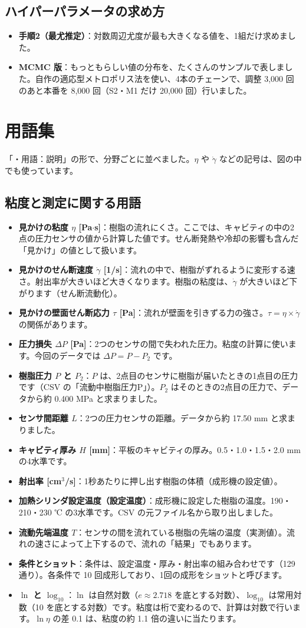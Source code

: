 \documentclass[paper=a4paper,fontsize=10.5pt,line_length=44zw,number_of_lines=38]{jlreq}
\newcommand{\gd}{\dot{\gamma}}
\newenvironment{termlist}{\begin{itemize}[label=・,leftmargin=1\zw,labelwidth=1\zw,labelsep=0pt,itemsep=0.4ex,topsep=0.6ex,parsep=0pt]}{\end{itemize}}
\newcommand{\term}[1]{\item \textbf{#1}：}
\newenvironment{points}{\begin{itemize}[label=$\triangleright$,leftmargin=1.5\zw,itemsep=0.3ex,topsep=0.5ex,parsep=0pt]}{\end{itemize}}
\newcommand{\pt}[1]{\item \textbf{#1}：}
\begin{document}
\subsection{ハイパーパラメータの求め方}
\begin{points}
\pt{手順2（最尤推定）}対数周辺尤度が最も大きくなる値を、1組だけ求めました。
\pt{MCMC 版}もっともらしい値の分布を、たくさんのサンプルで表しました。自作の適応型メトロポリス法を使い、4本のチェーンで、調整 3,000 回のあと本番を 8,000 回（S2・M1 だけ 20,000 回）行いました。
\end{points}

\section{用語集}

「・用語：説明」の形で、分野ごとに並べました。$\eta$ や $\gd$ などの記号は、図の中でも使っています。

\subsection{粘度と測定に関する用語}
\begin{termlist}
\term{見かけの粘度 $\eta$ [Pa$\cdot$s]}樹脂の流れにくさ。ここでは、キャビティの中の2点の圧力センサの値から計算した値です。せん断発熱や冷却の影響も含んだ「見かけ」の値として扱います。
\term{見かけのせん断速度 $\gd$ [1/s]}流れの中で、樹脂がずれるように変形する速さ。射出率が大きいほど大きくなります。樹脂の粘度は、$\gd$ が大きいほど下がります（せん断流動化）。
\term{見かけの壁面せん断応力 $\tau$ [Pa]}流れが壁面を引きずる力の強さ。$\tau = \eta \times \gd$ の関係があります。
\term{圧力損失 $\Delta P$ [Pa]}2つのセンサの間で失われた圧力。粘度の計算に使います。今回のデータでは $\Delta P = P - P_2$ です。
\term{樹脂圧力 $P$ と $P_2$}$P$ は、2点目のセンサに樹脂が届いたときの1点目の圧力です（CSV の「流動中樹脂圧力P」）。$P_2$ はそのときの2点目の圧力で、データから約 0.400 MPa と求まりました。
\term{センサ間距離 $L$}2つの圧力センサの距離。データから約 17.50 mm と求まりました。
\term{キャビティ厚み $H$ [mm]}平板のキャビティの厚み。0.5・1.0・1.5・2.0 mm の4水準です。
\term{射出率 [cm$^3$/s]}1秒あたりに押し出す樹脂の体積（成形機の設定値）。
\term{加熱シリンダ設定温度（設定温度）}成形機に設定した樹脂の温度。190・210・230 ℃ の3水準です。CSV の元ファイル名から取り出しました。
\term{流動先端温度 $T$}センサの間を流れている樹脂の先端の温度（実測値）。流れの速さによって上下するので、流れの「結果」でもあります。
\term{条件とショット}条件は、設定温度・厚み・射出率の組み合わせです（129 通り）。各条件で 10 回成形しており、1回の成形をショットと呼びます。
\term{$\ln$ と $\log_{10}$}$\ln$ は自然対数（$e \approx 2.718$ を底とする対数）、$\log_{10}$ は常用対数（10 を底とする対数）です。粘度は桁で変わるので、計算は対数で行います。$\ln\eta$ の差 0.1 は、粘度の約 1.1 倍の違いに当たります。
\end{termlist}
\end{document}
